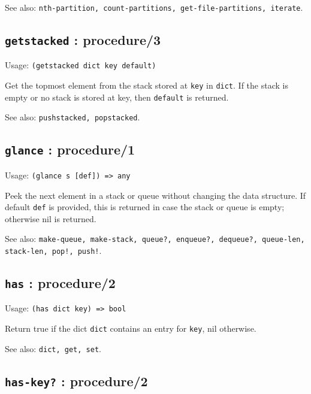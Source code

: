 \documentclass[
]{article}
\newcommand{\passthrough}[1]{#1}
\begin{document}
See also:
\passthrough{\lstinline!nth-partition, count-partitions, get-file-partitions, iterate!}.

\hypertarget{getstacked-procedure3-1}{%
\subsection{\texorpdfstring{\texttt{getstacked} :
procedure/3}{getstacked : procedure/3}}\label{getstacked-procedure3-1}}

Usage: \passthrough{\lstinline!(getstacked dict key default)!}

Get the topmost element from the stack stored at
\passthrough{\lstinline!key!} in \passthrough{\lstinline!dict!}. If the
stack is empty or no stack is stored at key, then
\passthrough{\lstinline!default!} is returned.

See also: \passthrough{\lstinline!pushstacked, popstacked!}.

\hypertarget{glance-procedure1-1}{%
\subsection{\texorpdfstring{\texttt{glance} :
procedure/1}{glance : procedure/1}}\label{glance-procedure1-1}}

Usage: \passthrough{\lstinline!(glance s [def]) => any!}

Peek the next element in a stack or queue without changing the data
structure. If default \passthrough{\lstinline!def!} is provided, this is
returned in case the stack or queue is empty; otherwise nil is returned.

See also:
\passthrough{\lstinline"make-queue, make-stack, queue?, enqueue?, dequeue?, queue-len, stack-len, pop!, push!"}.

\hypertarget{has-procedure2-1}{%
\subsection{\texorpdfstring{\texttt{has} :
procedure/2}{has : procedure/2}}\label{has-procedure2-1}}

Usage: \passthrough{\lstinline!(has dict key) => bool!}

Return true if the dict \passthrough{\lstinline!dict!} contains an entry
for \passthrough{\lstinline!key!}, nil otherwise.

See also: \passthrough{\lstinline!dict, get, set!}.

\hypertarget{has-key-procedure2-1}{%
\subsection{\texorpdfstring{\texttt{has-key?} :
procedure/2}{has-key? : procedure/2}}\label{has-key-procedure2-1}}
\end{document}
